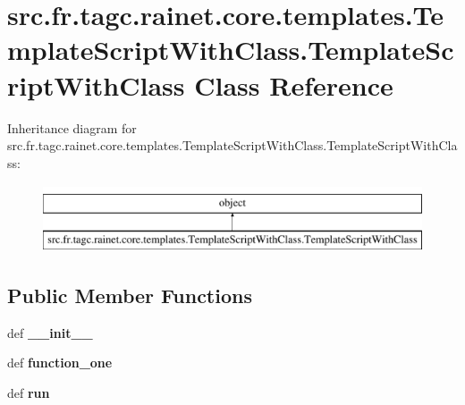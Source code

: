 \hypertarget{classsrc_1_1fr_1_1tagc_1_1rainet_1_1core_1_1templates_1_1TemplateScriptWithClass_1_1TemplateScriptWithClass}{\section{src.\-fr.\-tagc.\-rainet.\-core.\-templates.\-Template\-Script\-With\-Class.\-Template\-Script\-With\-Class Class Reference}
\label{classsrc_1_1fr_1_1tagc_1_1rainet_1_1core_1_1templates_1_1TemplateScriptWithClass_1_1TemplateScriptWithClass}
}
Inheritance diagram for src.\-fr.\-tagc.\-rainet.\-core.\-templates.\-Template\-Script\-With\-Class.\-Template\-Script\-With\-Class\-:\begin{figure}[H]
\begin{center}
\leavevmode
\includegraphics[height=2.000000cm]{classsrc_1_1fr_1_1tagc_1_1rainet_1_1core_1_1templates_1_1TemplateScriptWithClass_1_1TemplateScriptWithClass}
\end{center}
\end{figure}
\subsection*{Public Member Functions}
\begin{DoxyCompactItemize}
\item 
\hypertarget{classsrc_1_1fr_1_1tagc_1_1rainet_1_1core_1_1templates_1_1TemplateScriptWithClass_1_1TemplateScriptWithClass_a851e3e81e58e05f111eb1194103e8ad4}{def {\bfseries \-\_\-\-\_\-init\-\_\-\-\_\-}}\label{classsrc_1_1fr_1_1tagc_1_1rainet_1_1core_1_1templates_1_1TemplateScriptWithClass_1_1TemplateScriptWithClass_a851e3e81e58e05f111eb1194103e8ad4}

\item 
\hypertarget{classsrc_1_1fr_1_1tagc_1_1rainet_1_1core_1_1templates_1_1TemplateScriptWithClass_1_1TemplateScriptWithClass_a1af24cb1bb5733bb651975aaad8b3d83}{def {\bfseries function\-\_\-one}}\label{classsrc_1_1fr_1_1tagc_1_1rainet_1_1core_1_1templates_1_1TemplateScriptWithClass_1_1TemplateScriptWithClass_a1af24cb1bb5733bb651975aaad8b3d83}

\item 
\hypertarget{classsrc_1_1fr_1_1tagc_1_1rainet_1_1core_1_1templates_1_1TemplateScriptWithClass_1_1TemplateScriptWithClass_a209b343c7414cf2c2e4cb0b022050d73}{def {\bfseries run}}\label{classsrc_1_1fr_1_1tagc_1_1rainet_1_1core_1_1templates_1_1TemplateScriptWithClass_1_1TemplateScriptWithClass_a209b343c7414cf2c2e4cb0b022050d73}

\end{DoxyCompactItemize}
